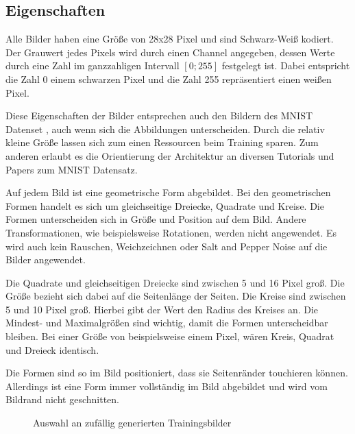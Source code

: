 \subsection{Eigenschaften}
Alle Bilder haben eine Größe von 28x28 Pixel und sind Schwarz-Weiß kodiert.
Der Grauwert jedes Pixels wird durch einen Channel angegeben, dessen Werte durch eine Zahl im ganzzahligen Intervall $[0; 255]$ festgelegt ist.
Dabei entspricht die Zahl 0 einem schwarzen Pixel und die Zahl 255 repräsentiert einen weißen Pixel.

Diese Eigenschaften der Bilder entsprechen auch den Bildern des MNIST Datenset \cite{dataset:mnist}, auch wenn sich die Abbildungen unterscheiden.
Durch die relativ kleine Größe lassen sich zum einen Ressourcen beim Training sparen.
Zum anderen erlaubt es die Orientierung der Architektur an diversen Tutorials und Papers zum MNIST Datensatz.
\newline

Auf jedem Bild ist eine geometrische Form abgebildet.
Bei den geometrischen Formen handelt es sich um gleichseitige Dreiecke, Quadrate und Kreise.
Die Formen unterscheiden sich in Größe und Position auf dem Bild.
Andere Transformationen, wie beispielsweise Rotationen, werden nicht angewendet.
Es wird auch kein Rauschen, Weichzeichnen oder Salt and Pepper Noise auf die Bilder angewendet.
\newline

Die Quadrate und gleichseitigen Dreiecke sind zwischen 5 und 16 Pixel groß.
Die Größe bezieht sich dabei auf die Seitenlänge der Seiten.
Die Kreise sind zwischen 5 und 10 Pixel groß.
Hierbei gibt der Wert den Radius des Kreises an.
Die Mindest- und Maximalgrößen sind wichtig, damit die Formen unterscheidbar bleiben.
Bei einer Größe von beispielsweise einem Pixel, wären Kreis, Quadrat und Dreieck identisch.
\newline

Die Formen sind so im Bild positioniert, dass sie Seitenränder touchieren können.
Allerdings ist eine Form immer vollständig im Bild abgebildet und wird vom Bildrand nicht geschnitten.

\newcommand{\trainDataImage}[1]{\subfloat{\fbox{\texttt{[image: \#1]}}}}
\begin{figure}[H]
	\centering
	\trainDataImage{kapitel/3\_methodik/data/circle\_00.png}
	\trainDataImage{kapitel/3\_methodik/data/circle\_01.png}
	\trainDataImage{kapitel/3\_methodik/data/circle\_02.png}\par 
	
	\trainDataImage{kapitel/3\_methodik/data/rectangle\_00.png}
	\trainDataImage{kapitel/3\_methodik/data/rectangle\_01.png}
	\trainDataImage{kapitel/3\_methodik/data/rectangle\_02.png}\par 
	
	\trainDataImage{kapitel/3\_methodik/data/triangle\_00.png}
	\trainDataImage{kapitel/3\_methodik/data/triangle\_01.png}
	\trainDataImage{kapitel/3\_methodik/data/triangle\_02.png}\par 
	
	\caption{Auswahl an zufällig generierten Trainingsbilder}
\end{figure}

